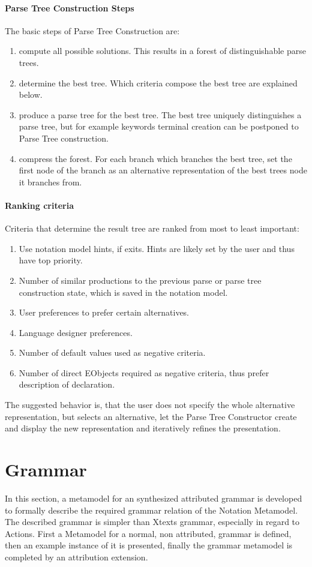 \paragraph{Parse Tree Construction Steps}
The basic steps of Parse Tree Construction are:
\begin{enumerate}
	\item compute all possible solutions. This results in a forest of distinguishable parse trees.
	\item determine the best tree. Which criteria compose the best tree are explained below.
	\item produce a parse tree for the best tree. The best tree uniquely distinguishes a parse tree, but for example keywords terminal creation can be postponed to Parse Tree construction.
	\item compress the forest. For each branch which branches the best tree, set the first node of the branch as an alternative representation of the best trees node it branches from.\\
\end{enumerate}

\paragraph{Ranking criteria} Criteria that determine the result tree are ranked from most to least important:
\begin{enumerate}
	\item Use notation model hints, if exits. Hints are likely set by the user and thus have top priority.
	\item Number of similar productions to the previous parse or parse tree construction state, which is saved in the notation model.
	\item User preferences to prefer certain alternatives.
	\item Language designer preferences.
	\item Number of default values used as negative criteria.
	\item Number of direct EObjects required as negative criteria, thus prefer description of declaration.
\end{enumerate}

The suggested behavior is, that the user does not specify the whole alternative representation, but selects an alternative, let the Parse Tree Constructor create and display the new representation and iteratively refines the presentation. 


\section{Grammar}
In this section, a metamodel for an synthesized attributed grammar is developed to formally describe the required grammar relation of the Notation Metamodel. The described grammar is simpler than Xtexts grammar, especially in regard to Actions. First a Metamodel for a normal, non attributed, grammar is defined, then an example instance of it is presented, finally the grammar metamodel is completed by an attribution extension.


